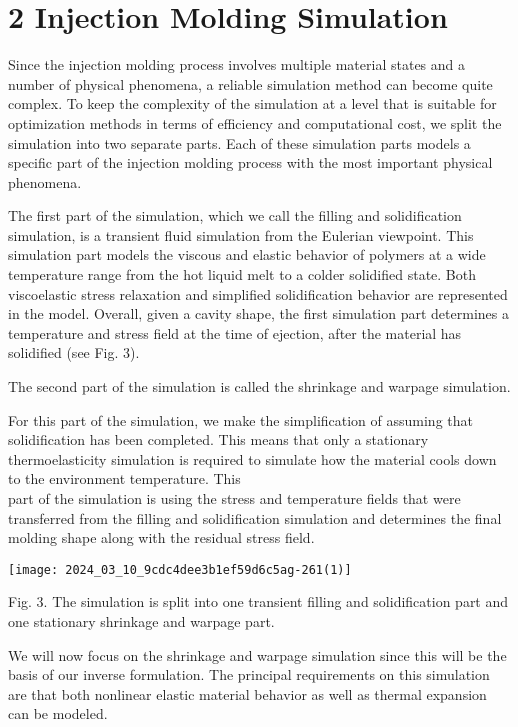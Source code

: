 \documentclass[10pt]{article}
\begin{document}
\section*{2 Injection Molding Simulation}
Since the injection molding process involves multiple material states and a number of physical phenomena, a reliable simulation method can become quite complex. To keep the complexity of the simulation at a level that is suitable for optimization methods in terms of efficiency and computational cost, we split the simulation into two separate parts. Each of these simulation parts models a specific part of the injection molding process with the most important physical phenomena.

The first part of the simulation, which we call the filling and solidification simulation, is a transient fluid simulation from the Eulerian viewpoint. This simulation part models the viscous and elastic behavior of polymers at a wide temperature range from the hot liquid melt to a colder solidified state. Both viscoelastic stress relaxation and simplified solidification behavior are represented in the model. Overall, given a cavity shape, the first simulation part determines a temperature and stress field at the time of ejection, after the material has solidified (see Fig. 3).

The second part of the simulation is called the shrinkage and warpage simulation.

For this part of the simulation, we make the simplification of assuming that solidification has been completed. This means that only a stationary thermoelasticity simulation is required to simulate how the material cools down to the environment temperature. This\\
part of the simulation is using the stress and temperature fields that were transferred from the filling and solidification simulation and determines the final molding shape along with the residual stress field.

\begin{center}
\texttt{[image: 2024\_03\_10\_9cdc4dee3b1ef59d6c5ag-261(1)]}
\end{center}

Fig. 3. The simulation is split into one transient filling and solidification part and one stationary shrinkage and warpage part.

We will now focus on the shrinkage and warpage simulation since this will be the basis of our inverse formulation. The principal requirements on this simulation are that both nonlinear elastic material behavior as well as thermal expansion can be modeled.
\end{document}
